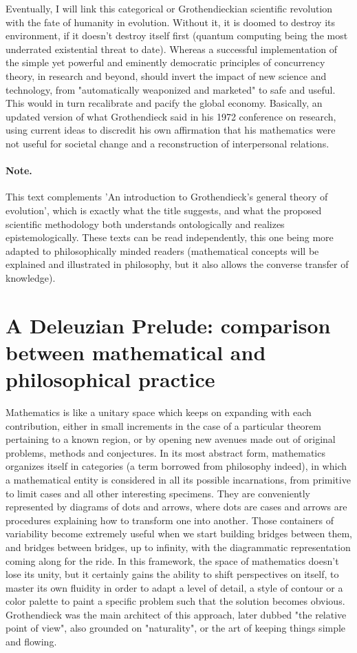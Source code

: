 \documentclass[11pt]{article}
\begin{document}
Eventually, I will link this categorical or Grothendieckian scientific revolution with
the fate of humanity in evolution. Without it, it is doomed to destroy its environment,
if it doesn't destroy itself first (quantum computing being the most underrated
existential threat to date). Whereas a successful implementation of the simple yet
powerful and eminently democratic principles of concurrency theory, in research and
beyond, should invert the impact of new science and technology, from "automatically
weaponized and marketed" to safe and useful. This would in turn recalibrate and pacify
the global economy. Basically, an updated version of what Grothendieck said in his 1972
conference on research, using current ideas to discredit his own affirmation that his
mathematics were not useful for societal change and a reconstruction of interpersonal
relations.

\paragraph{Note.}

This text complements 'An introduction to Grothendieck's general theory of evolution',
which is exactly what the title suggests, and what the proposed scientific methodology
both understands ontologically and realizes epistemologically. These texts can be read
independently, this one being more adapted to philosophically minded readers
(mathematical concepts will be explained and illustrated in philosophy, but it also
allows the converse transfer of knowledge).

\section*{A Deleuzian Prelude: comparison between mathematical and philosophical practice}

Mathematics is like a unitary space which keeps on expanding with each contribution,
either in small increments in the case of a particular theorem pertaining to a known
region, or by opening new avenues made out of original problems, methods and
conjectures. In its most abstract form, mathematics organizes itself in categories (a
term borrowed from philosophy indeed), in which a mathematical entity is considered in
all its possible incarnations, from primitive to limit cases and all other interesting
specimens. They are conveniently represented by diagrams of dots and arrows, where dots
are cases and arrows are procedures explaining how to transform one into another. Those
containers of variability become extremely useful when we start building bridges between
them, and bridges between bridges, up to infinity, with the diagrammatic representation
coming along for the ride. In this framework, the space of mathematics doesn't lose its
unity, but it certainly gains the ability to shift perspectives on itself, to master its
own fluidity in order to adapt a level of detail, a style of contour or a color palette
to paint a specific problem such that the solution becomes obvious. Grothendieck was the
main architect of this approach, later dubbed "the relative point of view", also
grounded on "naturality", or the art of keeping things simple and flowing.
\end{document}
